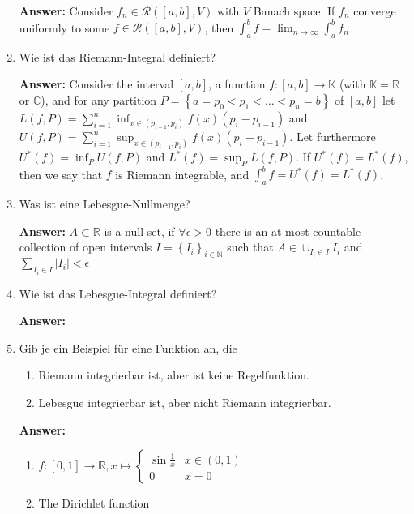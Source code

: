 \documentclass[11pt]{article}
\newcommand{\abs}[1]{\left|#1\right|}
\newcommand{\RR}[0]{\mathbb{R}}
\newcommand{\CC}[0]{\mathbb{C}}
\newcommand{\NN}[0]{\mathbb{N}}
\newcommand{\KK}[0]{\mathbb{K}}
\begin{document}
\begin{enumerate}
    \textbf{Answer:} Consider $f_n \in \mathcal{R}([a, b], V)$ with $V$ Banach space. If $f_n$ converge uniformly to some $f\in \mathcal{R}([a, b], V)$, then $\int_a^b f = \lim_{n \to \infty} \int_a^b f_n$

    \item Wie ist das Riemann-Integral definiert?

    \textbf{Answer:} Consider the interval $[a, b]$, a function $f\colon [a, b] \to \KK$ (with $\KK = \RR$ or $\CC$), and for any partition $P = \left\{a = p_0 < p_1 < \dots < p_n = b\right\}$ of $[a, b]$ let $L(f, P) = \sum_{i = 1}^n \inf_{x \in (p_{i-1}, p_i)}f(x) (p_i - p_{i-1})$ and $U(f, P) = \sum_{i = 1}^n \sup_{x \in (p_{i-1}, p_i)}f(x) (p_i - p_{i-1})$. Let furthermore $U^*(f) = \inf_{P} U(f, P)$ and $L^*(f) = \sup_{P} L(f, P)$. If $U^*(f) = L^*(f)$, then we say that $f$ is Riemann integrable, and $\int_a^b f = U^*(f) = L^*(f)$.

    \item Was ist eine Lebesgue-Nullmenge?

    \textbf{Answer:} $A \subset \RR$ is a null set, if $\forall \epsilon > 0$ there is an at most countable collection of open intervals $I = \left\{I_i\right\}_{i \in \NN}$ such that $A \in \cup_{I_i \in I} I_i$ and $\sum_{I_i \in I} \abs{I_i} < \epsilon$

    \item Wie ist das Lebesgue-Integral definiert?


    \textbf{Answer:}

    \item Gib je ein Beispiel für eine Funktion an, die
    \begin{enumerate}
        \item Riemann integrierbar ist, aber ist keine Regelfunktion.
        \item Lebesgue integrierbar ist, aber nicht Riemann integrierbar.
    \end{enumerate}

    \textbf{Answer:}
    \begin{enumerate}
        \item $f\colon [0, 1] \to \RR, x \mapsto \begin{cases}
            \sin{\frac{1}{x}}&x \in (0, 1)\\
            0&x=0
        \end{cases}$
        \item The Dirichlet function
    \end{enumerate}


\end{enumerate}
\end{document}
